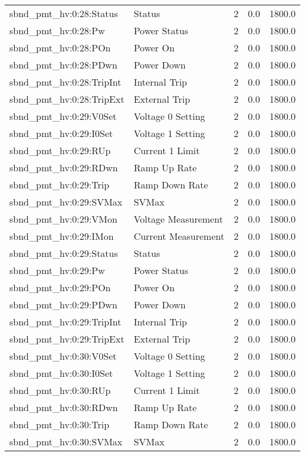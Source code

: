 \begin{center}
\begin{longtable}{l | l l l l }
sbnd\_pmt\_hv:0:28:Status & Status & 2 & 0.0 & 1800.0\\ 
sbnd\_pmt\_hv:0:28:Pw & Power Status & 2 & 0.0 & 1800.0\\ 
sbnd\_pmt\_hv:0:28:POn & Power On & 2 & 0.0 & 1800.0\\ 
sbnd\_pmt\_hv:0:28:PDwn & Power Down & 2 & 0.0 & 1800.0\\ 
sbnd\_pmt\_hv:0:28:TripInt & Internal Trip & 2 & 0.0 & 1800.0\\ 
sbnd\_pmt\_hv:0:28:TripExt & External Trip & 2 & 0.0 & 1800.0\\ 
sbnd\_pmt\_hv:0:29:V0Set & Voltage 0 Setting & 2 & 0.0 & 1800.0\\ 
sbnd\_pmt\_hv:0:29:I0Set & Voltage 1 Setting & 2 & 0.0 & 1800.0\\ 
sbnd\_pmt\_hv:0:29:RUp & Current 1 Limit & 2 & 0.0 & 1800.0\\ 
sbnd\_pmt\_hv:0:29:RDwn & Ramp Up Rate & 2 & 0.0 & 1800.0\\ 
sbnd\_pmt\_hv:0:29:Trip & Ramp Down Rate & 2 & 0.0 & 1800.0\\ 
sbnd\_pmt\_hv:0:29:SVMax & SVMax & 2 & 0.0 & 1800.0\\ 
sbnd\_pmt\_hv:0:29:VMon & Voltage Measurement & 2 & 0.0 & 1800.0\\ 
sbnd\_pmt\_hv:0:29:IMon & Current Measurement & 2 & 0.0 & 1800.0\\ 
sbnd\_pmt\_hv:0:29:Status & Status & 2 & 0.0 & 1800.0\\ 
sbnd\_pmt\_hv:0:29:Pw & Power Status & 2 & 0.0 & 1800.0\\ 
sbnd\_pmt\_hv:0:29:POn & Power On & 2 & 0.0 & 1800.0\\ 
sbnd\_pmt\_hv:0:29:PDwn & Power Down & 2 & 0.0 & 1800.0\\ 
sbnd\_pmt\_hv:0:29:TripInt & Internal Trip & 2 & 0.0 & 1800.0\\ 
sbnd\_pmt\_hv:0:29:TripExt & External Trip & 2 & 0.0 & 1800.0\\ 
sbnd\_pmt\_hv:0:30:V0Set & Voltage 0 Setting & 2 & 0.0 & 1800.0\\ 
sbnd\_pmt\_hv:0:30:I0Set & Voltage 1 Setting & 2 & 0.0 & 1800.0\\ 
sbnd\_pmt\_hv:0:30:RUp & Current 1 Limit & 2 & 0.0 & 1800.0\\ 
sbnd\_pmt\_hv:0:30:RDwn & Ramp Up Rate & 2 & 0.0 & 1800.0\\ 
sbnd\_pmt\_hv:0:30:Trip & Ramp Down Rate & 2 & 0.0 & 1800.0\\ 
sbnd\_pmt\_hv:0:30:SVMax & SVMax & 2 & 0.0 & 1800.0\\ 

\end{longtable}
\end{center}
